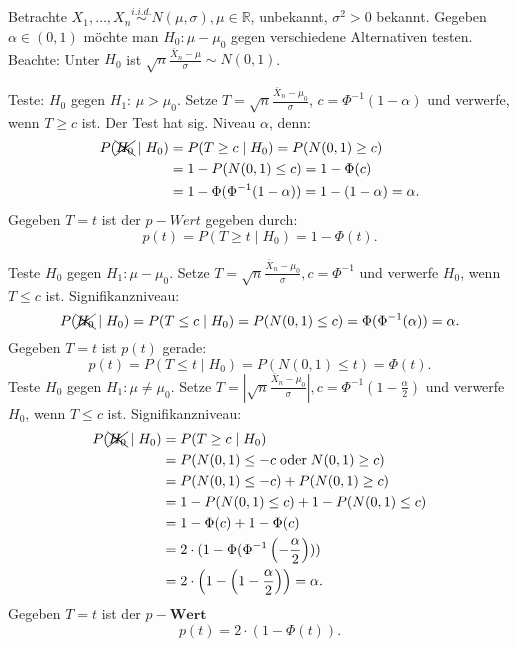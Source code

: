 \documentclass[10pt]{article}
\newcommand{\FZV}{X_1, \ldots, X_n} %
\newcommand{\IR}{\mathbb{R}} %
\newenvironment{BSP}[1][]
{\begin{Beispiel}[frametitle=#1]}{\end{Beispiel}}
\begin{document}
	\begin{BSP}[Beispiel 2.0.3 (Der z-Test (bekannte Varianz))]
		Betrachte $\FZV \overset{i.i.d.}{\sim} N(\mu,\sigma), \mu \in \IR$, unbekannt, $\sigma^2 > 0$ bekannt. Gegeben $\alpha \in (0,1)$ möchte man $H_0: \mu - \mu_0$ gegen verschiedene Alternativen testen. Beachte: Unter $H_0$ ist $\sqrt{n} \frac{\bar{X}_n - \mu}{\sigma} \sim N(0,1)$.
		
		Teste: $H_0$ gegen $H_1$: $\mu > \mu_0$. Setze $T = \sqrt{n} \frac{\bar{X}_n- \mu_0}{\sigma}$, $c = \Phi^{-1} (1- \alpha)$ und verwerfe, wenn $T\geq c$ ist. 
		Der Test hat sig. Niveau $\alpha$, denn: 
		\begin{equation*}
			\begin{split}
				P(\xcancel{H_0} \mid H_0) &= P(T \geq c \mid H_0) = P(N(0,1) \geq c)\\
				&= 1- P(N(0,1) \leq c) = 1- \Phi(c)\\
				&= 1- \Phi(\Phi^{-1}(1-\alpha)) = 1-(1-\alpha) = \alpha.
			\end{split}
		\end{equation*}
		Gegeben $T=t$ ist der $p-Wert$ gegeben durch:
		\begin{equation*}
			p(t) = P(T \geq t \mid H_0) = 1-\Phi(t). 
		\end{equation*}
		
		Teste $H_0$ gegen $H_1 : \mu - \mu_0$. Setze $T = \sqrt{n} \frac{\bar{X}_n - \mu_0}{\sigma}, c = \Phi^{-1}$ und verwerfe $H_0$, wenn $T \leq c$ ist. Signifikanzniveau:
		\begin{equation*}
			P(\xcancel{H_0} \mid H_0) = P(T \leq c \mid H_0) = P(N(0,1) \leq c) = \Phi(\Phi^{-1}(\alpha)) = \alpha.
		\end{equation*}
		Gegeben $T=t$ ist $p(t)$ gerade:
		\begin{equation*}
			p(t) = P(T \leq t \mid H_0) = P(N(0,1) \leq t) = \Phi(t).
		\end{equation*}
		Teste $H_0$ gegen $H_1: \mu \neq \mu_0$. Setze $T = \left\vert \sqrt{n} \frac{\bar{X}_n -\mu_0}{\sigma} \right\vert, c = \Phi^{-1} \left(1 -\frac{\alpha}{2}\right)$ und verwerfe $H_0$, wenn $T \leq c$ ist. Signifikanzniveau:
		\begin{equation*}
			\begin{split}
				P(\xcancel{H_0} \mid H_0) &= P(T \geq c \mid H_0)\\
				&= P(N(0,1) \leq -c \; \text{oder} \; N(0,1) \geq c)\\
				&= P(N(0,1) \leq -c) + P(N(0,1) \geq c)\\
				&= 1- P(N(0,1) \leq c) + 1 - P(N(0,1) \leq c)\\
				&= 1- \Phi(c) + 1- \Phi(c)\\
				&= 2 \cdot (1- \Phi(\Phi^{-1} \left(- \frac{\alpha}{2}\right)))\\
				&= 2 \cdot \left(1-\left(1-\frac{\alpha}{2}\right)\right) = \alpha.
			\end{split}
		\end{equation*}
		Gegeben $T=t$ ist der $p-\textbf{Wert}$
		\begin{equation*}
			p(t) = 2\cdot(1-\Phi(t)).
		\end{equation*}
	\end{BSP}
\end{document}
